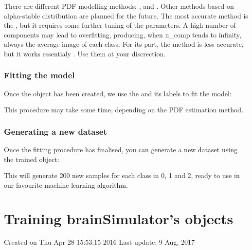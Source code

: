 \documentclass[letterpaper,10pt,english]{sphinxmanual}
\begin{document}
There are different PDF modelling methods: ,  and . Other methods based on alpha-stable distribution are planned for the future. The most accurate method is the , but it requires some further tuning of the parameters. A high number of components may lead to overfitting, producing, when n\_comp tends to infinity, always the average image of each class. For its part, the  method is less accurate, but it works essentialy . Use them at your discrection.


\subsection{Fitting the model}
\label{\detokenize{overview:fitting-the-model}}
Once the object has been created, we use the  and its labels to fit the model:

\begin{sphinxVerbatim}[commandchars=\\\{\}]
 
\end{sphinxVerbatim}

This procedure may take some time, depending on the PDF estimation method.


\subsection{Generating a new dataset}
\label{\detokenize{overview:generating-a-new-dataset}}
Once the fitting procedure has finalised, you can generate a new dataset using the trained object:

\begin{sphinxVerbatim}[commandchars=\\\{\}]
    \PYG{p}{[}  \PYG{p}{]}
\end{sphinxVerbatim}

This will generate 200 new samples for each class in 0, 1 and 2, ready to use in our favourite machine learning algorithm.


\chapter{Training brainSimulator’s objects}
\label{\detokenize{training:module-brainSimulator}}\label{\detokenize{training:training-brainsimulator-s-objects}}\label{\detokenize{training::doc}}\label{\detokenize{training:module-brainSimulator}}
Created on Thu Apr 28 15:53:15 2016
Last update: 9 Aug, 2017
\end{document}
